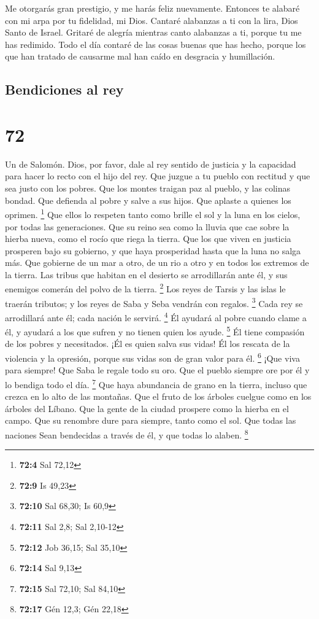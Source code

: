  Me otorgarás gran prestigio, y me harás feliz nuevamente.
 Entonces te alabaré con mi arpa por tu fidelidad, mi Dios.
Cantaré alabanzas a ti con la lira, Dios Santo de Israel. 
Gritaré de alegría mientras canto alabanzas a ti, porque tu me has
redimido.  Todo el día contaré de las cosas buenas que has
hecho, porque los que han tratado de causarme mal han caído en desgracia
y humillación.

\hypertarget{bendiciones-al-rey}{%
\subsection{Bendiciones al rey}\label{bendiciones-al-rey}}

\hypertarget{section-71}{%
\section{72}\label{section-71}}

Un de Salomón.  Dios, por favor, dale al rey sentido de
justicia y la capacidad para hacer lo recto con el hijo del rey.
 Que juzgue a tu pueblo con rectitud y que sea justo con los
pobres.  Que los montes traigan paz al pueblo, y las colinas
bondad.  Que defienda al pobre y salve a sus hijos. Que
aplaste a quienes los oprimen. \footnote{\textbf{72:4} Sal 72,12}
 Que ellos lo respeten tanto como brille el sol y la luna en
los cielos, por todas las generaciones.  Que su reino sea
como la lluvia que cae sobre la hierba nueva, como el rocío que riega la
tierra.  Que los que viven en justicia prosperen bajo su
gobierno, y que haya prosperidad hasta que la luna no salga más.
 Que gobierne de un mar a otro, de un rio a otro y en todos
los extremos de la tierra.  Las tribus que habitan en el
desierto se arrodillarán ante él, y sus enemigos comerán del polvo de la
tierra. \footnote{\textbf{72:9} Is 49,23}  Los reyes de
Tarsis y las islas le traerán tributos; y los reyes de Saba y Seba
vendrán con regalos. \footnote{\textbf{72:10} Sal 68,30; Is 60,9}
 Cada rey se arrodillará ante él; cada nación le servirá.
\footnote{\textbf{72:11} Sal 2,8; Sal 2,10-12}  Él ayudará
al pobre cuando clame a él, y ayudará a los que sufren y no tienen quien
los ayude. \footnote{\textbf{72:12} Job 36,15; Sal 35,10} 
Él tiene compasión de los pobres y necesitados. ¡Él es quien salva sus
vidas!  Él los rescata de la violencia y la opresión,
porque sus vidas son de gran valor para él. \footnote{\textbf{72:14} Sal
  9,13}  ¡Que viva para siempre! Que Saba le regale todo su
oro. Que el pueblo siempre ore por él y lo bendiga todo el día.
\footnote{\textbf{72:15} Sal 72,10; Sal 84,10}  Que haya
abundancia de grano en la tierra, incluso que crezca en lo alto de las
montañas. Que el fruto de los árboles cuelgue como en los árboles del
Líbano. Que la gente de la ciudad prospere como la hierba en el campo.
 Que su renombre dure para siempre, tanto como el sol. Que
todas las naciones Sean bendecidas a través de él, y que todas lo
alaben. \footnote{\textbf{72:17} Gén 12,3; Gén 22,18}

